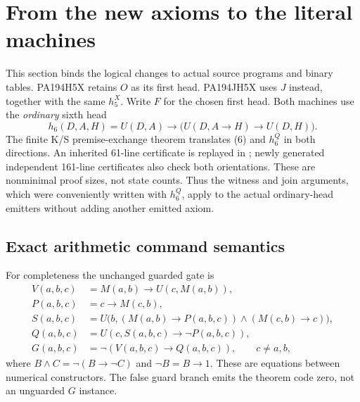 \section{From the new axioms to the literal machines}
\label{sec:implementation}

This section binds the logical changes to actual source programs and
binary tables.  PA194H5X retains $O$ as its first head.  PA194JH5X uses
$J$ instead, together with the same $h_5^X$.  Write $F$ for the chosen
first head.  Both machines use the \emph{ordinary} sixth head
\[
 h_6(D,A,H)=U(D,A)\to\bigl(U(D,A\to H)\to U(D,H)\bigr).
 \tag{6}
\]
The finite K/S premise-exchange theorem translates (6) and $h_6^Q$ in
both directions.  An inherited 61-line certificate is replayed in
; newly generated independent
161-line certificates also check both orientations.  These are
nonminimal proof sizes, not state counts.  Thus the witness and join
arguments, which were conveniently written with $h_6^Q$, apply to the
actual ordinary-head emitters without adding another emitted axiom.

\subsection{Exact arithmetic command semantics}

For completeness the unchanged guarded gate is
\begin{align*}
 V(a,b,c)&=M(a,b)\to U(c,M(a,b)),\\
 P(a,b,c)&=c\to M(c,b),\\
 S(a,b,c)&=U\bigl(b,(M(a,b)\to P(a,b,c))\wedge(M(c,b)\to c)\bigr),\\
 Q(a,b,c)&=U(c,S(a,b,c)\to\neg P(a,b,c)),\\
 G(a,b,c)&=\neg(V(a,b,c)\to Q(a,b,c)),\qquad c\ne a,b,
\end{align*}
where $B\wedge C=\neg(B\to\neg C)$ and $\neg B=B\to1$.
These are equations between numerical constructors.  The false guard
branch emits the theorem code zero, not an unguarded $G$ instance.

